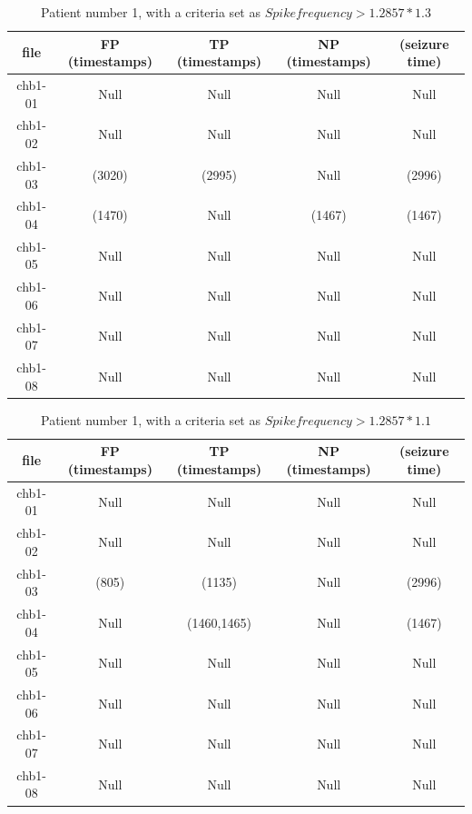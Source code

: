 \begin{table}[H]
\centering
    \begin{tabular}{c | c |c |c | c}
        \hline
         file &  FP (timestamps) & TP (timestamps) & NP (timestamps) & (seizure time)  \\
        \hline
        chb1-01 & Null & Null & Null  & Null  \\
        chb1-02 & Null & Null & Null & Null \\
        chb1-03 & (3020) & (2995) & Null & (2996) \\
        chb1-04	& (1470) & Null & (1467) & (1467)\\
        chb1-05 & Null & Null & Null & Null\\
        chb1-06 & Null & Null & Null & Null\\
        chb1-07 &  Null & Null & Null & Null  \\
        chb1-08 &  Null & Null & Null & Null  \\
        \hline
     \end{tabular} 
\caption{Patient number 1, with a criteria set as $Spike frequency > 1.2857*1.3$ }
\label{Freq1}
\end{table}

\begin{table}[H]
\centering
    \begin{tabular}{c | c |c |c | c}
        \hline
         file &  FP (timestamps) & TP (timestamps) & NP (timestamps) & (seizure time)  \\
        \hline
        chb1-01 & Null & Null & Null  & Null  \\
        chb1-02 & Null & Null & Null & Null \\
        chb1-03 & (805) & (1135) & Null & (2996) \\
        chb1-04	& Null & (1460,1465) & Null & (1467)\\
        chb1-05 & Null & Null & Null & Null\\
        chb1-06 & Null & Null & Null & Null\\
        chb1-07 &  Null & Null & Null & Null  \\
        chb1-08 &  Null & Null & Null & Null  \\
        \hline
     \end{tabular} 
\caption{Patient number 1, with a criteria set as $Spike frequency > 1.2857*1.1$ }
\label{Freq2}
\end{table}

